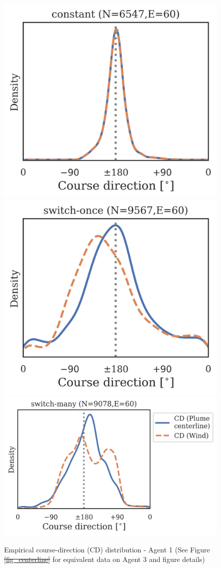 \documentclass[5p,twocolumn,authoryear]{elsarticle}
\providecommand{\DIFaddtex}[1]{{\protect\color{blue}\uwave{#1}}} %
\providecommand{\DIFdeltex}[1]{{\protect\color{red}\sout{#1}}}                      %
\providecommand{\DIFaddFL}[1]{\DIFadd{#1}} %
\providecommand{\DIFdelFL}[1]{\DIFdel{#1}} %
\providecommand{\DIFaddbeginFL}{} %
\providecommand{\DIFaddendFL}{} %
\providecommand{\DIFdelbeginFL}{} %
\providecommand{\DIFdelendFL}{} %
\providecommand{\DIFadd}[1]{\texorpdfstring{\DIFaddtex{#1}}{#1}} %
\providecommand{\DIFdel}[1]{\texorpdfstring{\DIFdeltex{#1}}{}} %
\newcommand{\DIFscaledelfig}{0.5}
\newlength{\DIFdelgraphicswidth} %
\newlength{\DIFdelgraphicsheight} %
\newcommand{\DIFaddincludegraphics}[2][]{{\color{blue}\fbox{\DIFOincludegraphics[#1]{#2}}}} %
\newcommand{\DIFdelincludegraphics}[2][]{%
\sbox{\DIFdelgraphicsbox}{\DIFOincludegraphics[#1]{#2}}%
\settoboxwidth{\DIFdelgraphicswidth}{\DIFdelgraphicsbox} %
\settoboxtotalheight{\DIFdelgraphicsheight}{\DIFdelgraphicsbox} %
\scalebox{\DIFscaledelfig}{%
\parbox[b]{\DIFdelgraphicswidth}{\usebox{\DIFdelgraphicsbox}\\[-\baselineskip] \rule{\DIFdelgraphicswidth}{0em}}\llap{\resizebox{\DIFdelgraphicswidth}{\DIFdelgraphicsheight}{%
\setlength{\unitlength}{\DIFdelgraphicswidth}%
\begin{picture}(1,1)%
\thicklines\linethickness{2pt} %
{\color[rgb]{1,0,0}\put(0,0){\framebox(1,1){}}}%
{\color[rgb]{1,0,0}\put(0,0){\line( 1,1){1}}}%
{\color[rgb]{1,0,0}\put(0,1){\line(1,-1){1}}}%
\end{picture}%
}\hspace*{3pt}}} %
} %
\DeclareRobustCommand{\DIFaddbeginFL}{\DIFOaddbeginFL \let\includegraphics\DIFaddincludegraphics} %
\DeclareRobustCommand{\DIFaddendFL}{\DIFOaddendFL \let\includegraphics\DIFOincludegraphics} %
\DeclareRobustCommand{\DIFdelbeginFL}{\DIFOdelbeginFL \let\includegraphics\DIFdelincludegraphics} %
\DeclareRobustCommand{\DIFdelendFL}{\DIFOaddendFL \let\includegraphics\DIFOincludegraphics} %
\begin{document}
\begin{figure}[h!]
\centering
\includegraphics[width=0.28\linewidth]{regime_dists_2760377_constantx5b5_TRACK_CD.png}
\includegraphics[width=0.28\linewidth]{regime_dists_2760377_switch45x5b5_TRACK_CD.png}
\includegraphics[width=0.405\linewidth]{regime_dists_2760377_noisy3x5b5_TRACK_CD.png}
\caption{Empirical course-direction (CD) distribution - Agent 1 (See Figure \DIFdelbeginFL \DIFdelFL{\ref{fig_centerline} }\DIFdelendFL \DIFaddbeginFL \DIFaddFL{\ref{fig_regimes_coursedir} }\DIFaddendFL for equivalent data on Agent 3 and figure details)} 
\end{figure}
\end{document}
